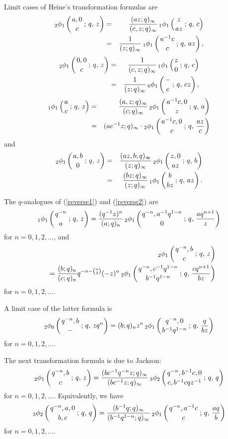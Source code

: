\documentclass[envcountchap,graybox]{svmono}
\newcommand{\qhyp}[5]{\mbox{}_{#1}{\phi}_{#2}
\left(\genfrac{}{}{0pt}{}{#3}{#4}\,;\,q,\,#5\right)}
\begin{document}
Limit cases of Heine's transformation formulas are
\begin{eqnarray}
\label{Heinelimit1}
\qhyp{2}{1}{a,0}{c}{z}
&=&\frac{(az;q)_{\infty}}{(c,z;q)_{\infty}}\,\qhyp{1}{1}{z}{az}{c}\\
&=&\frac{1}{(z;q)_{\infty}}\,\qhyp{1}{1}{a^{-1}c}{c}{az},\label{Heinelimit2}
\end{eqnarray}
\begin{eqnarray}
\label{Heinelimit3}
\qhyp{2}{1}{0,0}{c}{z}
&=&\frac{1}{(c,z;q)_{\infty}}\,\qhyp{1}{1}{z}{0}{c}\\
&=&\frac{1}{(z;q)_{\infty}}\,\qhyp{0}{1}{-}{c}{cz},\label{Heinelimit4}
\end{eqnarray}
\begin{eqnarray}
\label{Heinelimit5}
\qhyp{1}{1}{a}{c}{z}
&=&\frac{(a,z;q)_{\infty}}{(c;q)_{\infty}}\,\qhyp{2}{1}{a^{-1}c,0}{z}{a}\\
&=&(ac^{-1}z;q)_{\infty}\cdot\qhyp{2}{1}{a^{-1}c,0}{c}{\frac{az}{c}}\label{Heinelimit6}
\end{eqnarray}
and
\begin{eqnarray}
\label{Heinelimit7}
\qhyp{2}{1}{a,b}{0}{z}
&=&\frac{(az,b;q)_{\infty}}{(z;q)_{\infty}}\,\qhyp{2}{1}{z,0}{az}{b}\\
&=&\frac{(bz;q)_{\infty}}{(z;q)_{\infty}}\,\qhyp{1}{1}{b}{bz}{az}.\label{Heinelimit8}
\end{eqnarray}

The $q$-analogues of (\ref{reverse1}) and (\ref{reverse2}) are
\begin{equation}
\label{qreverse1}
\qhyp{1}{1}{q^{-n}}{a}{z}=\frac{(q^{-1}z)^n}{(a;q)_n}\,
\qhyp{2}{1}{q^{-n},a^{-1}q^{1-n}}{0}{\frac{aq^{n+1}}{z}}
\end{equation}
for $n=0,1,2,\ldots$, and
\begin{eqnarray}
\label{qreverse2}
& &\qhyp{2}{1}{q^{-n},b}{c}{z}\nonumber\\
& &=\frac{(b;q)_n}{(c;q)_n}q^{-n-\binom{n}{2}}(-z)^n\,
\qhyp{2}{1}{q^{-n},c^{-1}q^{1-n}}{b^{-1}q^{1-n}}{\frac{cq^{n+1}}{bz}}
\end{eqnarray}
for $n=0,1,2,\ldots$.

A limit case of the latter formula is
\begin{equation}
\label{qreverse3}
\qhyp{2}{0}{q^{-n},b}{-}{zq^n}=(b;q)_nz^n\,
\qhyp{2}{1}{q^{-n},0}{b^{-1}q^{1-n}}{\frac{q}{bz}}
\end{equation}
for $n=0,1,2,\ldots$.

The next transformation formula is due to Jackson:
\begin{equation}
\label{Jackson1}\index{Jackson's transformation formula}\index{Transformation formula!Jackson}
\qhyp{2}{1}{q^{-n},b}{c}{z}=\frac{(bc^{-1}q^{-n}z;q)_{\infty}}
{(bc^{-1}z;q)_{\infty}}\,\qhyp{3}{2}{q^{-n},b^{-1}c,0}{c,b^{-1}cqz^{-1}}{q}
\end{equation}
for $n=0,1,2,\ldots$. Equivalently, we have
\begin{equation}
\label{Jackson2}
\qhyp{3}{2}{q^{-n},a,0}{b,c}{q}=\frac{(b^{-1}q;q)_{\infty}}
{(b^{-1}q^{1-n};q)_{\infty}}\,\qhyp{2}{1}{q^{-n},a^{-1}c}{c}{\frac{aq}{b}}
\end{equation}
for $n=0,1,2,\ldots$.
\end{document}
